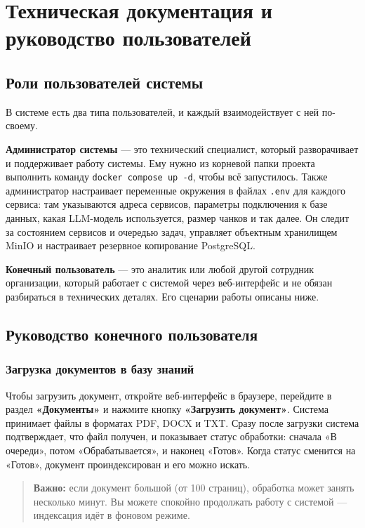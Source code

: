 
\section{Техническая документация и руководство пользователей}

\subsection{Роли пользователей системы}

В системе есть два типа пользователей, и каждый взаимодействует с ней по-своему.

\textbf{Администратор системы} — это технический специалист, который разворачивает и поддерживает работу системы. Ему нужно из корневой папки проекта выполнить команду \texttt{docker compose up -d}, чтобы всё запустилось. Также администратор настраивает переменные окружения в файлах \texttt{.env} для каждого сервиса: там указываются адреса сервисов, параметры подключения к базе данных, какая LLM-модель используется, размер чанков и так далее. Он следит за состоянием сервисов и очередью задач, управляет объектным хранилищем MinIO и настраивает резервное копирование PostgreSQL.

\textbf{Конечный пользователь} — это аналитик или любой другой сотрудник организации, который работает с системой через веб-интерфейс и не обязан разбираться в технических деталях. Его сценарии работы описаны ниже.

\subsection{Руководство конечного пользователя}

\subsubsection{Загрузка документов в базу знаний}

Чтобы загрузить документ, откройте веб-интерфейс в браузере, перейдите в раздел \textbf{«Документы»} и нажмите кнопку \textbf{«Загрузить документ»}. Система принимает файлы в форматах PDF, DOCX и TXT. Сразу после загрузки система подтверждает, что файл получен, и показывает статус обработки: сначала «В очереди», потом «Обрабатывается», и наконец «Готов». Когда статус сменится на «Готов», документ проиндексирован и его можно искать.

\begin{quote}
\textbf{Важно:} если документ большой (от 100 страниц), обработка может занять несколько минут. Вы можете спокойно продолжать работу с системой — индексация идёт в фоновом режиме.
\end{quote}

